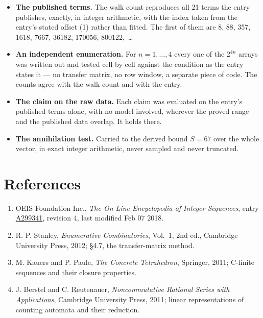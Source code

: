 \documentclass[11pt]{article}
\theoremstyle{definition}
\begin{document}
\begin{itemize}

\item {\bfseries The published terms.} The walk count reproduces all 21 terms the entry publishes, exactly, in integer arithmetic, with the index taken from the entry's stated offset (1) rather than fitted. The first of them are 8, 88, 357, 1618, 7667, 36182, 170056, 800122,~\dots

\item {\bfseries An independent enumeration.} For $n = 1,\dots,4$ every one of the $2^{4n}$ arrays was written out and tested cell by cell against the condition as the entry states it --- no transfer matrix, no row window, a separate piece of code. The counts agree with the walk count and with the entry.

\item {\bfseries The claim on the raw data.} Each claim was evaluated on the entry's published terms alone, with no model involved, wherever the proved range and the published data overlap. It holds there.

\item {\bfseries The annihilation test.} Carried to the derived bound $S = 67$ over the whole vector, in exact integer arithmetic, never sampled and never truncated.

\end{itemize}

\section{References}

\begin{enumerate}

\item OEIS Foundation Inc., \emph{The On-Line Encyclopedia of Integer Sequences}, entry \href{https://oeis.org/A299341}{A299341}, revision 4, last modified Feb 07 2018.

\item R. P. Stanley, \emph{Enumerative Combinatorics}, Vol.~1, 2nd ed., Cambridge University Press, 2012; \S4.7, the transfer-matrix method.

\item M. Kauers and P. Paule, \emph{The Concrete Tetrahedron}, Springer, 2011; C-finite sequences and their closure properties.

\item J. Berstel and C. Reutenauer, \emph{Noncommutative Rational Series with Applications}, Cambridge University Press, 2011; linear representations of counting automata and their reduction.

\end{enumerate}
\end{document}
